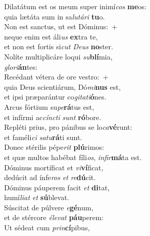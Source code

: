 \evenverse Dilatátum est os meum super inimí\textit{cos} \textbf{me}os:~\*\\
\evenverse quia lætáta sum in sa\textit{lu}\textit{tá}\textit{ri} \textbf{tu}o.\\
\oddverse Non est sanctus, ut est Dóminus:~+\\
\oddverse  neque enim est áli\textit{us} \textbf{ex}tra te,~\*\\
\oddverse et non est fortis si\textit{cut} \textit{De}\textit{us} \textbf{no}ster.\\
\evenverse Nolíte multiplicáre loqui \textit{su}\textbf{blí}mia,~\*\\
\evenverse \textit{glo}\textit{ri}\textbf{án}tes:\\
\oddverse Recédant vétera de ore vestro:~+\\
\oddverse  quia Deus scientiárum, Dó\textit{mi}\textbf{nus} est,~\*\\
\oddverse et ipsi præparántur co\textit{gi}\textit{ta}\textit{ti}\textbf{ó}nes.\\
\evenverse Arcus fórtium su\textit{pe}\textbf{rá}tus est,~\*\\
\evenverse et infírmi ac\textit{cín}\textit{cti} \textit{sunt} \textbf{ró}bore.\\
\oddverse Repléti prius, pro pánibus se lo\textit{ca}\textbf{vé}runt:~\*\\
\oddverse et faméli\textit{ci} \textit{sa}\textit{tu}\textbf{rá}ti sunt.\\
\evenverse Donec stérilis pépe\textit{rit} \textbf{plú}rimos:~\*\\
\evenverse et quæ multos habébat fíli\textit{os}, \textit{in}\textit{fir}\textbf{má}ta est.\\
\oddverse Dóminus mortíficat et \textit{vi}\textbf{ví}ficat,~\*\\
\oddverse dedúcit ad ínfe\textit{ros} \textit{et} \textit{re}\textbf{dú}cit.\\
\evenverse Dóminus páuperem facit \textit{et} \textbf{di}tat,~\*\\
\evenverse humí\textit{li}\textit{at} \textit{et} \textbf{sú}blevat.\\
\oddverse Súscitat de púlvere \textit{e}\textbf{gé}num,~\*\\
\oddverse et de stércore \textit{é}\textit{le}\textit{vat} \textbf{páu}perem:\\
\evenverse Ut sédeat cum \textit{prin}\textbf{cí}pibus,~\*\\
